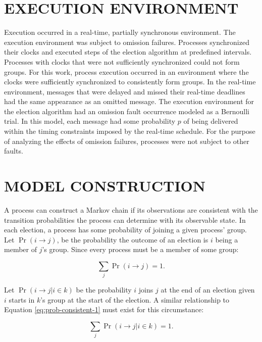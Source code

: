 \section{EXECUTION ENVIRONMENT}

Execution occurred in a real-time, partially synchronous environment.
The execution environment was subject to omission failures.
Processes synchronized their clocks and executed steps of the election algorithm at predefined intervals.
Processes with clocks that were not sufficiently synchronized could not form groups.
For this work, process execution occurred in an environment where the clocks were sufficiently synchronized to consistently form groups.
In the real-time environment, messages that were delayed and missed their real-time deadlines had the same appearance as an omitted message.
The execution environment for the election algorithm had an omission fault occurrence modeled as a Bernoulli trial.
In this model, each message had some probability $p$ of being delivered within the timing constraints imposed by the real-time schedule.
For the purpose of analyzing the effects of omission failures, processes were not subject to other faults.

\section{MODEL CONSTRUCTION}

A process can construct a Markov chain if its observations are consistent with the transition probabilities the process can determine with its observable state.
In each election, a process has some probability of joining a given process' group.
Let $\Pr(i \rightarrow j)$, be the probability the outcome of an election is $i$ being a member of $j$'s group.
Since every process must be a member of some group:

\begin{equation}
\sum_{j} \Pr(i \rightarrow j) = 1.
\label{eq:prob-consistent-1}
\end{equation}

Let $\Pr(i \rightarrow j | i \in k)$ be the probability $i$ joins $j$ at the end of an election given $i$ starts in $k$'s group at the start of the election.
A similar relationship to Equation \ref{eq:prob-consistent-1} must exist for this circumstance:

\begin{equation}
\sum_{j} \Pr(i \rightarrow j | i \in k) = 1.
\label{eq:prob-consistent-2}
\end{equation}

